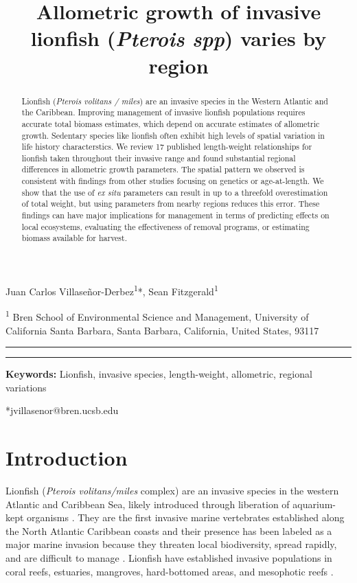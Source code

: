 \documentclass[12pt,]{article}
\title{\LARGE{Allometric growth of invasive lionfish (\textit{Pterois spp}) varies by region}}
\author{}
\date{}
\theoremstyle{definition}
\theoremstyle{definition}
\theoremstyle{definition}
\theoremstyle{remark}
\begin{document}
\maketitle

Juan Carlos Villaseñor-Derbez\textsuperscript{1}*, Sean
Fitzgerald\textsuperscript{1}

\textsuperscript{1} Bren School of Environmental Science and Management,
University of California Santa Barbara, Santa Barbara, California,
United States, 93117

\begin{center}\rule{0.5\linewidth}{\linethickness}\end{center}

\begin{abstract}
Lionfish (\textit{Pterois volitans / miles}) are an invasive species in the Western Atlantic and the Caribbean. Improving management of invasive lionfish populations requires accurate total biomass estimates, which depend on accurate estimates of allometric growth. Sedentary species like lionfish often exhibit high levels of spatial variation in life history characterstics. We review 17 published length-weight relationships for lionfish taken throughout their invasive range and found substantial regional differences in allometric growth parameters. The spatial pattern we observed is consistent with findings from other studies focusing on genetics or age-at-length. We show that the use of \textit{ex situ} parameters can result in up to a threefold overestimation of total weight, but using parameters from nearby regions reduces this error. These findings can have major implications for management in terms of predicting effects on local ecosystems, evaluating the effectiveness of removal programs, or estimating biomass available for harvest.
\end{abstract}

\begin{center}\rule{0.5\linewidth}{\linethickness}\end{center}

\textbf{Keywords:} Lionfish, invasive species, length-weight,
allometric, regional variations

*jvillasenor@bren.ucsb.edu

\section{Introduction}\label{introduction}

Lionfish (\emph{Pterois volitans/miles} complex) are an invasive species
in the western Atlantic and Caribbean Sea, likely introduced through
liberation of aquarium-kept organisms \citep{betancurr_2011}. They are
the first invasive marine vertebrates established along the North
Atlantic Caribbean coasts
\citep{schofield_2009,schofield_2010,sabidoitza_2016} and their presence
has been labeled as a major marine invasion because they threaten local
biodiversity, spread rapidly, and are difficult to manage
\citep{hixon_2016}. Lionfish have established invasive populations in
coral reefs, estuaries, mangroves, hard-bottomed areas, and mesophotic
reefs
\citep{barbour_2010,jud_2011,muoz_2011,claydon_2012,andradibrown_2017,gress_2017}.
\end{document}
